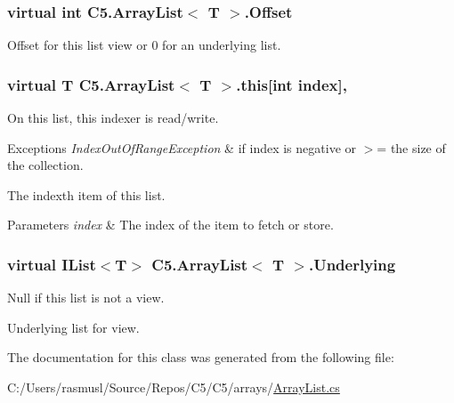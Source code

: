 \subsubsection[{Offset}]{\setlength{\rightskip}{0pt plus 5cm}virtual int {\bf C5.\+Array\+List}$<$ T $>$.Offset\hspace{0.3cm}{\ttfamily [get]}}\label{class_c5_1_1_array_list_ae811cb2c92d313a6d4d54f31dd0caed5}




Offset for this list view or 0 for an underlying list.\hypertarget{class_c5_1_1_array_list_a2a4990b7502658c6f8bbebe2a3eea351}{}
\subsubsection[{this[int index]}]{\setlength{\rightskip}{0pt plus 5cm}virtual T {\bf C5.\+Array\+List}$<$ T $>$.this\mbox{[}int index\mbox{]}\hspace{0.3cm}{\ttfamily [get]}, {\ttfamily [set]}}\label{class_c5_1_1_array_list_a2a4990b7502658c6f8bbebe2a3eea351}


On this list, this indexer is read/write. 


\begin{DoxyExceptions}{Exceptions}
{\em Index\+Out\+Of\+Range\+Exception} & if index is negative or $>$= the size of the collection.\\
\hline
\end{DoxyExceptions}


The index\textquotesingle{}th item of this list.


\begin{DoxyParams}{Parameters}
{\em index} & The index of the item to fetch or store.\\
\hline
\end{DoxyParams}
\hypertarget{class_c5_1_1_array_list_a41d739fd8a2d169b3121cc05871323f0}{}
\subsubsection[{Underlying}]{\setlength{\rightskip}{0pt plus 5cm}virtual {\bf I\+List}$<$T$>$ {\bf C5.\+Array\+List}$<$ T $>$.Underlying\hspace{0.3cm}{\ttfamily [get]}}\label{class_c5_1_1_array_list_a41d739fd8a2d169b3121cc05871323f0}


Null if this list is not a view. 

Underlying list for view.

The documentation for this class was generated from the following file\+:\begin{DoxyCompactItemize}
\item 
C\+:/\+Users/rasmusl/\+Source/\+Repos/\+C5/\+C5/arrays/\hyperlink{_array_list_8cs}{Array\+List.\+cs}\end{DoxyCompactItemize}
